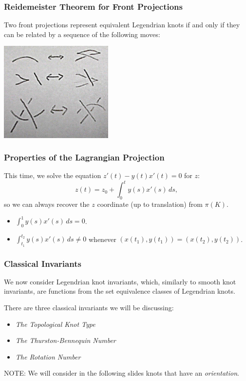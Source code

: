 \documentclass{beamer}
\begin{document}
\begin{frame}
    \frametitle{Reidemeister Theorem for Front Projections}
    \begin{theorem}
        Two front projections represent equivalent Legendrian knots if and only if
        they can be related by a sequence of the following moves:
    \end{theorem}
    \begin{center}
    \includegraphics[height=5cm]{Redemeister.jpg}
    \end{center}
\end{frame}

\begin{frame}
\frametitle{Properties of the Lagrangian Projection}
    This time, we solve the equation $z'(t) - y(t)x'(t) = 0$ for $z$:
    \[ z(t) = z_0 + \int_0^t y(s)x'(s)\,ds, \]
    so we can always recover the $z$ coordinate (up to translation) from $\pi(K)$.

    \begin{itemize}
    \item $\int_0^1 y(s)x'(s)\,ds = 0$.
    \item $\int_{t_1}^{t_2}y(s)x'(s)\,ds \neq 0$ whenever $(x(t_1),y(t_1))=(x(t_2),y(t_2))$.
    \end{itemize}
\end{frame}

\begin{frame}
    \frametitle{Classical Invariants}
    We now consider \alert{Legendrian knot invariants}, which, similarly to smooth
    knot invariants, are functions from the set equivalence classes of Legendrian
    knots.

    There are three classical invariants we will be discussing:
    \begin{itemize}
        \item \textit{The Topological Knot Type}
        \item \textit{The Thurston-Bennequin Number}
        \item \textit{The Rotation Number}
    \end{itemize}
    \alert{NOTE}: We will consider in the following slides knots
    that have an \textit{orientation}.
\end{frame}
\end{document}
